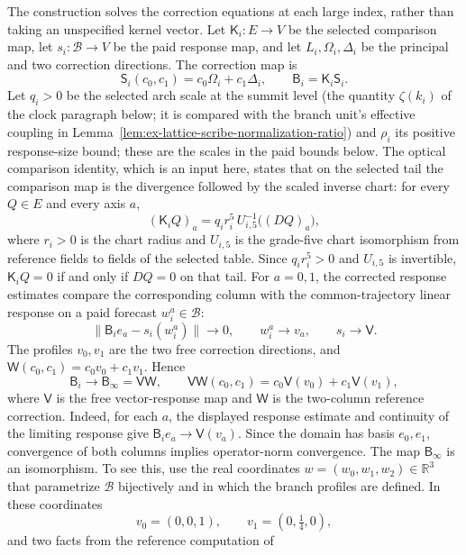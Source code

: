 The construction solves the correction equations at each
large index, rather than taking an unspecified kernel vector. Let
$\mathsf K_i:E\to V$ be the selected comparison map, let
$s_i:\mathcal B\to V$ be the paid response map, and let
$L_i,\Omega_i,\Delta_i$ be the
principal and two correction directions. The correction map is
\[
 \mathsf S_i(c_0,c_1)=c_0\Omega_i+c_1\Delta_i,
 \qquad \mathsf B_i=\mathsf K_i\mathsf S_i.
\]
Let $q_i>0$ be the selected arch scale at the summit level (the
quantity $\zeta(k_i)$ of the clock paragraph below; it is compared with
the branch unit's effective coupling in
Lemma~\ref{lem:ex-lattice-scribe-normalization-ratio}) and $\rho_i$ its
positive response-size bound; these are the scales in the paid bounds below.
The optical comparison identity, which is an input here, states that on
the selected tail the comparison map is the divergence followed by the
scaled inverse chart: for every $Q\in E$ and every axis $a$,
\begin{equation}
 (\mathsf K_iQ)_a=q_ir_i^5\,U_{i,5}^{-1}\bigl((DQ)_a\bigr),
 \label{eq:ex-lattice-scribe-optical-identity}
\end{equation}
where $r_i>0$ is the chart radius and $U_{i,5}$ is the grade-five chart
isomorphism from reference fields to fields of the selected table. Since
$q_ir_i^5>0$ and $U_{i,5}$ is invertible, $\mathsf K_iQ=0$ if and only if
$DQ=0$ on that tail.
For $a=0,1$, the corrected response estimates compare the corresponding
column with the common-trajectory linear response on a paid forecast
$w_i^a\in\mathcal B$:
\[
 \|\mathsf B_i e_a-s_i(w_i^a)\|\longrightarrow0,
 \qquad w_i^a\longrightarrow v_a,
 \qquad s_i\longrightarrow\mathsf V.
\]
The profiles $v_0,v_1$ are the two free correction directions, and
$\mathsf W(c_0,c_1)=c_0v_0+c_1v_1$. Hence
\[
 \mathsf B_i\longrightarrow
 \mathsf B_\infty=\mathsf V\mathsf W,
 \qquad
 \mathsf V\mathsf W(c_0,c_1)=c_0\mathsf V(v_0)+c_1\mathsf V(v_1),
\]
where $\mathsf V$ is the free vector-response map and $\mathsf W$ is the
two-column reference correction. Indeed, for each $a$, the displayed
response estimate and continuity of the limiting response give
$\mathsf B_i e_a\to\mathsf V(v_a)$. Since the domain has basis
$e_0,e_1$, convergence of both columns implies operator-norm convergence.
The map $\mathsf B_\infty$ is an isomorphism. To see this, use the real
coordinates $w=(w_0,w_1,w_2)\in\mathbb R^3$ that parametrize
$\mathcal B$ bijectively and in which the branch profiles are defined.
In these coordinates
\[
 v_0=(0,0,1),\qquad v_1=(0,\tfrac14,0),
\]
and two facts from the reference computation of
